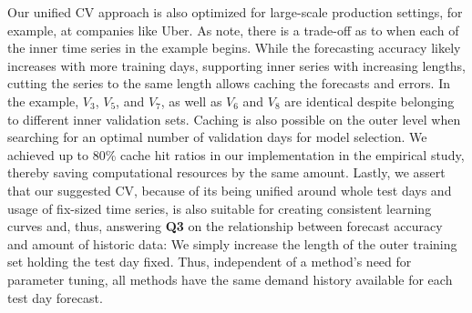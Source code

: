 Our unified CV approach is also optimized for large-scale production settings,
    for example, at companies like Uber.
As \cite{bell2018} note, there is a trade-off as to when each of the
    inner time series in the example begins.
While the forecasting accuracy likely increases with more training days,
    supporting inner series with increasing lengths, cutting the series
    to the same length allows caching the forecasts and errors.
In the example, $V_3$, $V_5$, and $V_7$, as well as $V_6$ and $V_8$ are
    identical despite belonging to different inner validation sets.
Caching is also possible on the outer level when searching for an optimal
    number of validation days for model selection.
We achieved up to 80\% cache hit ratios in our implementation in the
    empirical study, thereby saving computational resources by the same
    amount.
Lastly, we assert that our suggested CV, because of its being unified
    around whole test days and usage of fix-sized time series, is also
    suitable for creating consistent learning curves and, thus, answering
    \textbf{Q3} on the relationship between forecast accuracy and amount of
    historic data:
We simply increase the length of the outer training set holding the test day
    fixed.
Thus, independent of a method's need for parameter tuning, all methods have
    the same demand history available for each test day forecast.
